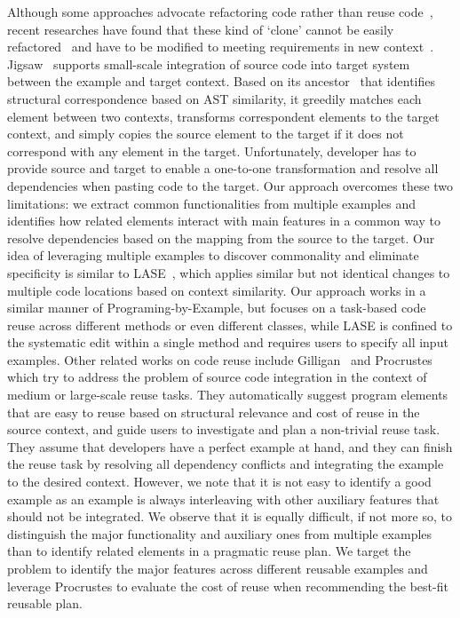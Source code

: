    Although some approaches advocate refactoring code rather than reuse code~\cite{fowler:refactoring}, recent researches have found that these kind of `clone' cannot be easily refactored~\cite{Kim:cloneGenealogy05} and have to be modified to meeting requirements in new context~\cite{Selby:largeReuse05}.  Jigsaw~\cite{Cottrell:jigsaw08} supports small-scale integration of source code into target system  between the example and target context. Based on its ancestor~\cite{Cottrell:generalize07} that identifies structural correspondence based on AST similarity, it greedily matches each element between two contexts, transforms correspondent elements to the target context, and simply copies the source element to the target if it does not correspond with any element in the target. Unfortunately, developer has to provide source and target to enable a one-to-one transformation and resolve all dependencies when pasting code to the target.  Our approach overcomes these two limitations: we extract common functionalities from multiple examples and  identifies how related elements interact with main features in a common way to resolve dependencies based on the mapping from the source to the target.  Our idea of leveraging multiple examples to discover commonality and eliminate specificity is similar to LASE~\cite{LASE:ICSE13}, which applies similar but not identical changes to multiple code locations based on context similarity. Our approach works in a similar manner of Programing-by-Example, but focuses on a task-based code reuse across different methods or even different classes, while LASE is confined to the systematic edit within a single method and requires users to specify all input examples. Other related works on code reuse include
Gilligan~\cite{Holmes:reuse07} and Procrustes~\cite{Holmes:ASE09} which try to address the problem of source code integration in the context of medium or large-scale reuse tasks. They automatically suggest program elements that are easy to reuse based on structural relevance and cost of reuse in the source context, and guide users to investigate and plan a non-trivial reuse task. They assume that developers have a perfect example at hand, and they can finish the reuse task by resolving all dependency conflicts and integrating the example to the desired context. However, we note that it is not easy to identify a good example as an example is always interleaving with other auxiliary features that should not be integrated. We observe that it is equally difficult, if not more so, to distinguish the major functionality and auxiliary ones from multiple examples than to identify related elements in a pragmatic reuse plan. We target the problem to identify the major features across different reusable examples and leverage Procrustes to evaluate the cost of reuse when recommending the best-fit reusable plan.






